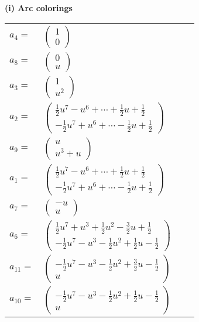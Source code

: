 \documentclass[1p]{elsarticle_modified}
\theoremstyle{definition}
\begin{document}
\flushleft \textbf{(i) Arc colorings}\\
\begin{tabular}{m{7pt} m{180pt} m{7pt} m{180pt} }
\flushright $a_{4}=$&$\begin{pmatrix}1\\0\end{pmatrix}$ \\
\flushright $a_{8}=$&$\begin{pmatrix}0\\u\end{pmatrix}$ \\
\flushright $a_{3}=$&$\begin{pmatrix}1\\u^2\end{pmatrix}$ \\
\flushright $a_{2}=$&$\begin{pmatrix}\frac{1}{2} u^7- u^6+\cdots+\frac{1}{2} u+\frac{1}{2}\\-\frac{1}{2} u^7+u^6+\cdots-\frac{1}{2} u+\frac{1}{2}\end{pmatrix}$ \\
\flushright $a_{9}=$&$\begin{pmatrix}u\\u^3+u\end{pmatrix}$ \\
\flushright $a_{1}=$&$\begin{pmatrix}\frac{1}{2} u^7- u^6+\cdots+\frac{1}{2} u+\frac{1}{2}\\-\frac{1}{2} u^7+u^6+\cdots-\frac{1}{2} u+\frac{1}{2}\end{pmatrix}$ \\
\flushright $a_{7}=$&$\begin{pmatrix}- u\\u\end{pmatrix}$ \\
\flushright $a_{6}=$&$\begin{pmatrix}\frac{1}{2} u^7+u^3+\frac{1}{2} u^2-\frac{3}{2} u+\frac{1}{2}\\-\frac{1}{2} u^7- u^3-\frac{1}{2} u^2+\frac{1}{2} u-\frac{1}{2}\end{pmatrix}$ \\
\flushright $a_{11}=$&$\begin{pmatrix}-\frac{1}{2} u^7- u^3-\frac{1}{2} u^2+\frac{3}{2} u-\frac{1}{2}\\u\end{pmatrix}$ \\
\flushright $a_{10}=$&$\begin{pmatrix}-\frac{1}{2} u^7- u^3-\frac{1}{2} u^2+\frac{1}{2} u-\frac{1}{2}\\u\end{pmatrix}$ \\

\end{tabular}
\end{document}
